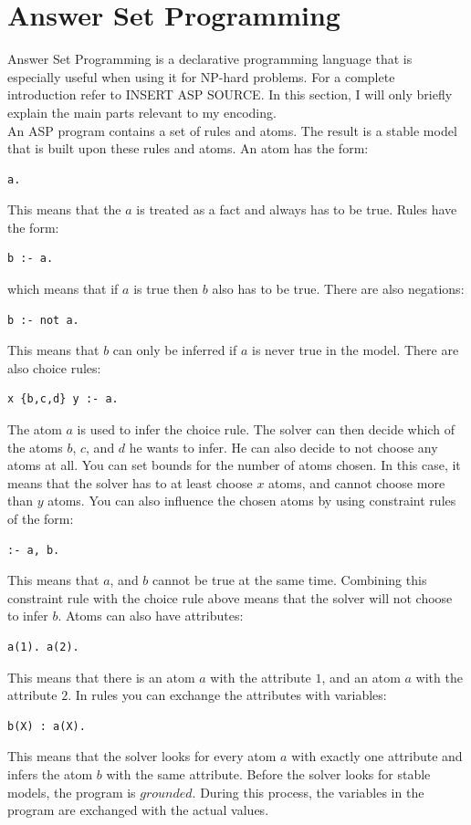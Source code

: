 \documentclass[runningheads]{llncs}
\begin{document}
\section{Answer Set Programming}
Answer Set Programming is a declarative programming language that is especially useful when using it for NP-hard problems. For a complete introduction refer to INSERT ASP SOURCE. In this section, I will only briefly explain the main parts relevant to my encoding. \\
An ASP program contains a set of rules and atoms. The result is a stable model that is built upon these rules and atoms. An atom has the form: 
\begin{verbatim}
a.
\end{verbatim}
This means that the $a$ is treated as a fact and always has to be true. Rules have the form:
\begin{verbatim}
b :- a.
\end{verbatim}
which means that if $a$ is true then $b$ also has to be true. There are also negations:
\begin{verbatim}
b :- not a.
\end{verbatim}
This means that $b$ can only be inferred if $a$ is never true in the model. There are also choice rules:
\begin{verbatim}
x {b,c,d} y :- a.
\end{verbatim}
The atom $a$ is used to infer the choice rule. The solver can then decide which of the atoms $b$, $c$, and $d$ he wants to infer. He can also decide to not choose any atoms at all. You can set bounds for the number of atoms chosen. In this case, it means that the solver has to at least choose $x$ atoms, and cannot choose more than $y$ atoms. You can also influence the chosen atoms by using constraint rules of the form:
\begin{verbatim}
:- a, b.
\end{verbatim}
This means that $a$, and $b$ cannot be true at the same time. Combining this constraint rule with the choice rule above means that the solver will not choose to infer $b$. Atoms can also have attributes:
\begin{verbatim}
a(1). a(2).
\end{verbatim}
This means that there is an atom $a$ with the attribute $1$, and an atom $a$ with the attribute $2$. In rules you can exchange the attributes with variables:
\begin{verbatim}
b(X) : a(X).
\end{verbatim}
This means that the solver looks for every atom $a$ with exactly one attribute and infers the atom $b$ with the same attribute. Before the solver looks for stable models, the program is $grounded$. During this process, the variables in the program are exchanged with the actual values. \\
\end{document}

